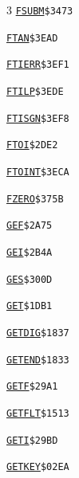 \begin{multicols}{3}
\noindent\hyperlink{l:FSUBM}{\texttt{FSUBM}}\hfill\texttt{\$3473~\phantom{000}\llap{\pageref{l:FSUBM}}}\par
\noindent\hyperlink{l:FTAN}{\texttt{FTAN}}\hfill\texttt{\$3EAD~\phantom{000}\llap{\pageref{l:FTAN}}}\par
\noindent\hyperlink{l:FTIERR}{\texttt{FTIERR}}\hfill\texttt{\$3EF1~\phantom{000}\llap{\pageref{l:FTIERR}}}\par
\noindent\hyperlink{l:FTILP}{\texttt{FTILP}}\hfill\texttt{\$3EDE~\phantom{000}\llap{\pageref{l:FTILP}}}\par
\noindent\hyperlink{l:FTISGN}{\texttt{FTISGN}}\hfill\texttt{\$3EF8~\phantom{000}\llap{\pageref{l:FTISGN}}}\par
\noindent\hyperlink{l:FTOI}{\texttt{FTOI}}\hfill\texttt{\$2DE2~\phantom{000}\llap{\pageref{l:FTOI}}}\par
\noindent\hyperlink{l:FTOINT}{\texttt{FTOINT}}\hfill\texttt{\$3ECA~\phantom{000}\llap{\pageref{l:FTOINT}}}\par
\noindent\hyperlink{l:FZERO}{\texttt{FZERO}}\hfill\texttt{\$375B~\phantom{000}\llap{\pageref{l:FZERO}}}\par
\noindent\hyperlink{l:GEF}{\texttt{GEF}}\hfill\texttt{\$2A75~\phantom{000}\llap{\pageref{l:GEF}}}\par
\noindent\hyperlink{l:GEI}{\texttt{GEI}}\hfill\texttt{\$2B4A~\phantom{000}\llap{\pageref{l:GEI}}}\par
\noindent\hyperlink{l:GES}{\texttt{GES}}\hfill\texttt{\$300D~\phantom{000}\llap{\pageref{l:GES}}}\par
\noindent\hyperlink{l:GET}{\texttt{GET}}\hfill\texttt{\$1DB1~\phantom{000}\llap{\pageref{l:GET}}}\par
\noindent\hyperlink{l:GETDIG}{\texttt{GETDIG}}\hfill\texttt{\$1837~\phantom{000}\llap{\pageref{l:GETDIG}}}\par
\noindent\hyperlink{l:GETEND}{\texttt{GETEND}}\hfill\texttt{\$1833~\phantom{000}\llap{\pageref{l:GETEND}}}\par
\noindent\hyperlink{l:GETF}{\texttt{GETF}}\hfill\texttt{\$29A1~\phantom{000}\llap{\pageref{l:GETF}}}\par
\noindent\hyperlink{l:GETFLT}{\texttt{GETFLT}}\hfill\texttt{\$1513~\phantom{000}\llap{\pageref{l:GETFLT}}}\par
\noindent\hyperlink{l:GETI}{\texttt{GETI}}\hfill\texttt{\$29BD~\phantom{000}\llap{\pageref{l:GETI}}}\par
\noindent\hyperlink{l:GETKEY}{\texttt{GETKEY}}\hfill\texttt{\$02EA~\phantom{000}\llap{\pageref{l:GETKEY}}}\par

\end{multicols}
